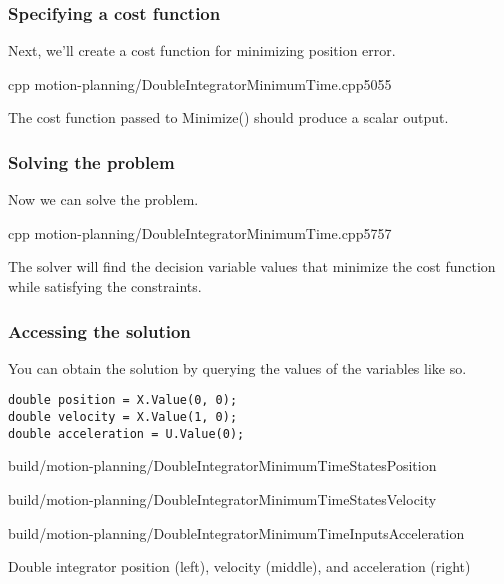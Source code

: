 \subsubsection{Specifying a cost function}

Next, we'll create a cost function for minimizing position error.
\begin{coderemotesubset}{cpp}
  {motion-planning/DoubleIntegratorMinimumTime.cpp}{50}{55}
\end{coderemotesubset}

The cost function passed to Minimize() should produce a scalar output.

\subsubsection{Solving the problem}

Now we can solve the problem.
\begin{coderemotesubset}{cpp}
  {motion-planning/DoubleIntegratorMinimumTime.cpp}{57}{57}
\end{coderemotesubset}

The solver will find the decision variable values that minimize the cost
function while satisfying the constraints.

\subsubsection{Accessing the solution}

You can obtain the solution by querying the values of the variables like so.
\begin{code}
  \begin{lstlisting}[style=customCpp]
double position = X.Value(0, 0);
double velocity = X.Value(1, 0);
double acceleration = U.Value(0);
  \end{lstlisting}
\end{code}
\begin{bookfigure}
  \begin{minisvg}{3}
    {build/motion-planning/DoubleIntegratorMinimumTimeStatesPosition}
  \end{minisvg}
  \hfill
  \begin{minisvg}{3}
    {build/motion-planning/DoubleIntegratorMinimumTimeStatesVelocity}
  \end{minisvg}
  \begin{minisvg}{3}
    {build/motion-planning/DoubleIntegratorMinimumTimeInputsAcceleration}
  \end{minisvg}
  \caption{Double integrator position (left), velocity (middle), and
    acceleration (right)}
\end{bookfigure}

